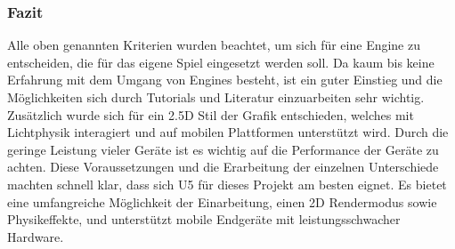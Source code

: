 \subsubsection{Fazit}
Alle oben genannten Kriterien wurden beachtet, um sich für eine Engine zu entscheiden, die für das eigene Spiel eingesetzt werden soll. Da kaum bis keine Erfahrung mit dem Umgang von Engines besteht, ist ein guter Einstieg und die Möglichkeiten sich durch Tutorials und Literatur einzuarbeiten sehr wichtig. Zusätzlich wurde sich für ein 2.5D Stil der Grafik entschieden, welches mit Lichtphysik interagiert und auf mobilen Plattformen unterstützt wird. Durch die geringe Leistung vieler Geräte ist es wichtig auf die Performance der Geräte zu achten. Diese Voraussetzungen und die Erarbeitung der einzelnen Unterschiede machten schnell klar, dass sich \ac{U5} für dieses Projekt am besten eignet. Es bietet eine umfangreiche Möglichkeit der Einarbeitung, einen 2D Rendermodus sowie Physikeffekte, und unterstützt mobile Endgeräte mit leistungsschwacher Hardware. 


\newpage
